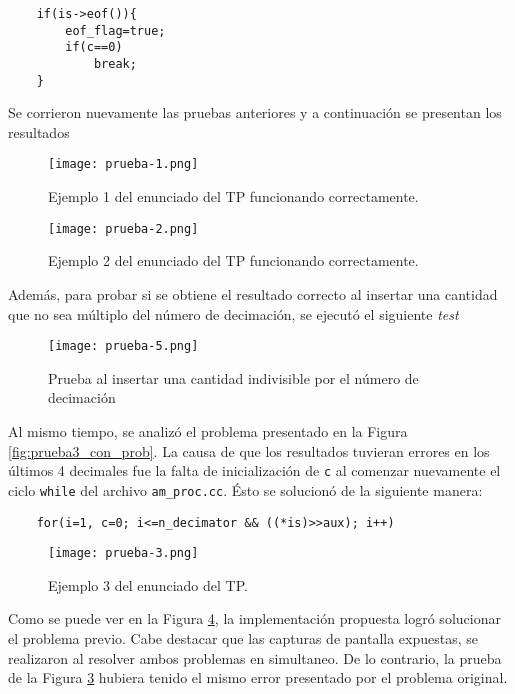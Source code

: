 \begin{lstlisting}
	if(is->eof()){
		eof_flag=true;
		if(c==0)
			break;
	}
\end{lstlisting}

Se corrieron nuevamente las pruebas anteriores y a continuación se presentan los resultados

\begin{figure}[H]
	\centering
		\texttt{[image: prueba-1.png]}
	\caption{Ejemplo 1 del enunciado del TP funcionando correctamente.}
	\label{fig:prueba1}
\end{figure}

\begin{figure}[H]
	\centering
		\texttt{[image: prueba-2.png]}
	\caption{Ejemplo 2 del enunciado del TP funcionando correctamente.}
	\label{fig:prueba2}
\end{figure}

Además, para probar si se obtiene el resultado correcto al insertar una cantidad que no sea múltiplo del número de decimación, se ejecutó el siguiente \emph{test}

\begin{figure}[H]
	\centering
		\texttt{[image: prueba-5.png]}
	\caption{Prueba al insertar una cantidad indivisible por el número de decimación}
	\label{fig_prueba5}
\end{figure}

Al mismo tiempo, se analizó el problema presentado en la Figura \ref{fig:prueba3_con_prob}. La causa de que los resultados tuvieran errores en los últimos 4 decimales fue la falta de inicialización de \texttt{c} al comenzar nuevamente el ciclo \texttt{while} del archivo \texttt{am\_proc.cc}. Ésto se solucionó de la siguiente manera:

\begin{lstlisting}
	for(i=1, c=0; i<=n_decimator && ((*is)>>aux); i++)
\end{lstlisting}

\begin{figure}[H]
	\centering
		\texttt{[image: prueba-3.png]}
	\caption{Ejemplo 3 del enunciado del TP.}
	\label{fig:prueba3}
\end{figure}

Como se puede ver en la Figura \ref{fig:prueba3}, la implementación propuesta logró solucionar el problema previo. Cabe destacar que las capturas de pantalla expuestas, se realizaron al resolver ambos problemas en simultaneo. De lo contrario, la prueba de la Figura \ref{fig_prueba5} hubiera tenido el mismo error presentado por el problema original.

